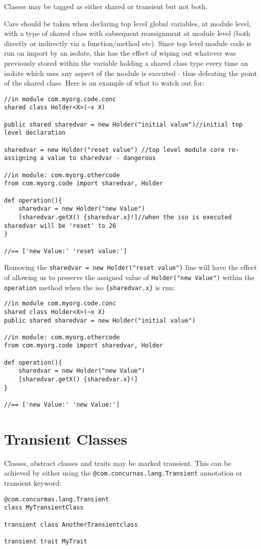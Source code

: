 \documentclass[conc-doc]{subfiles}
\begin{document}
Classes may be tagged as either shared or transient but not both.

Care should be taken when declaring top level global variables, at module level, with a type of shared class with subsequent reassignment at module level (both directly or indirectly via a function/method etc). Since top level module code is run on import by an isolate, this has the effect of wiping out whatever was previously stored within the variable holding a shared class type every time an isolate which uses any aspect of the module is executed - thus defeating the point of the shared class. Here is an example of what to watch out for:

\begin{lstlisting}
//in module com.myorg.code.conc
shared class Holder<X>(~x X)

public shared sharedvar = new Holder("initial value")//initial top level declaration

sharedvar = new Holder("reset value") //top level module core re-assigning a value to sharedvar - dangerous

//in module: com.myorg.othercode
from com.myorg.code import sharedvar, Holder

def operation(){
	sharedvar = new Holder("new Value")
	[sharedvar.getX() {sharedvar.x}!]//when the iso is executed sharedvar will be 'reset' to 26
}

//== ['new Value:' 'reset value:']
\end{lstlisting}

Removing the \lstinline{sharedvar = new Holder("reset value")} line will have the effect of allowing us to preserve the assigned value of \lstinline{Holder("new Value")} within the \lstinline{operation} method when the iso \lstinline!{sharedvar.x}! is run:

\begin{lstlisting}
//in module com.myorg.code.conc
shared class Holder<X>(~x X)
public shared sharedvar = new Holder("initial value")

//in module: com.myorg.othercode
from com.myorg.code import sharedvar, Holder

def operation(){
	sharedvar = new Holder("new Value")
	[sharedvar.getX() {sharedvar.x}!]
}

//== ['new Value:' 'new Value:']
\end{lstlisting}


\section{Transient Classes}
\label{sec:transientClasses}
Classes, abstract classes and traits may be marked transient. This can be achieved by either using the \lstinline{@com.concurnas.lang.Transient} annotation or transient keyword:
\begin{lstlisting}
@com.concurmas.lang.Transient
class MyTransientClass

transient class AnotherTransientclass

transient trait MyTrait
\end{lstlisting}
\end{document}
